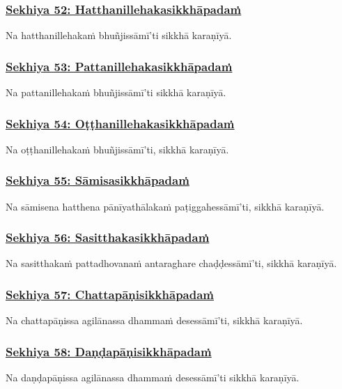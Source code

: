 \subsubsection*{\hyperref[training52]{Sekhiya 52: Hatthanillehakasikkhāpadaṁ}}
\label{sekh52}
Na hatthanillehakaṁ bhuñjissāmī'ti sikkhā karaṇīyā.

\subsubsection*{\hyperref[training53]{Sekhiya 53: Pattanillehakasikkhāpadaṁ}}
\label{sekh53}
Na pattanillehakaṁ bhuñjissāmī'ti sikkhā karaṇīyā.

\subsubsection*{\hyperref[training54]{Sekhiya 54: Oṭṭhanillehakasikkhāpadaṁ}}
\label{sekh54}
Na oṭṭhanillehakaṁ bhuñjissāmī'ti, sikkhā karaṇīyā.

\subsubsection*{\hyperref[training55]{Sekhiya 55: Sāmisasikkhāpadaṁ}}
\label{sekh55}
Na sāmisena hatthena pānīyathālakaṁ paṭiggahessāmī'ti, sikkhā karaṇīyā.

\subsubsection*{\hyperref[training56]{Sekhiya 56: Sasitthakasikkhāpadaṁ}}
\label{sekh56}
Na sasitthakaṁ pattadhovanaṁ antaraghare chaḍḍessāmī'ti, sikkhā karaṇīyā.

\subsubsection*{\hyperref[training57]{Sekhiya 57: Chattapāṇisikkhāpadaṁ}}
\label{sekh57}
Na chattapāṇissa agilānassa dhammaṁ desessāmī'ti, sikkhā karaṇīyā.

\subsubsection*{\hyperref[training58]{Sekhiya 58: Daṇḍapāṇisikkhāpadaṁ}}
\label{sekh58}
Na daṇḍapāṇissa agilānassa dhammaṁ desessāmī'ti sikkhā karaṇīyā.

